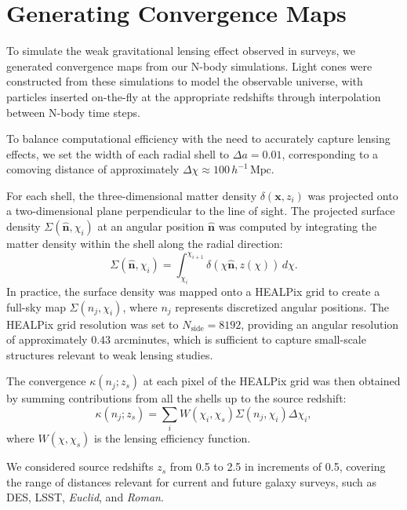 \section{Generating Convergence Maps}
To simulate the weak gravitational lensing effect observed in surveys, we generated convergence maps from our N-body simulations. Light cones were constructed from these simulations to model the observable universe, with particles inserted on-the-fly at the appropriate redshifts through interpolation between N-body time steps.

To balance computational efficiency with the need to accurately capture lensing effects, we set the width of each radial shell to $\Delta a = 0.01$, corresponding to a comoving distance of approximately $\Delta \chi \approx 100 \, h^{-1} \, \text{Mpc}$.

For each shell, the three-dimensional matter density $\delta(\mathbf{x}, z_i)$ was projected onto a two-dimensional plane perpendicular to the line of sight. The projected surface density $\Sigma(\hat{\mathbf{n}}, \chi_i)$ at an angular position $\hat{\mathbf{n}}$ was computed by integrating the matter density within the shell along the radial direction:
\begin{equation}
    \Sigma(\hat{\mathbf{n}}, \chi_i) = \int_{\chi_i}^{\chi_{i+1}} \delta(\chi \hat{\mathbf{n}}, z(\chi)) \, d\chi.
\end{equation}
In practice, the surface density was mapped onto a HEALPix grid \citep{Górski_2005} to create a full-sky map $\Sigma(n_j, \chi_i)$, where $n_j$ represents discretized angular positions. The HEALPix grid resolution was set to $N_{\text{side}} = 8192$, providing an angular resolution of approximately $0.43$ arcminutes, which is sufficient to capture small-scale structures relevant to weak lensing studies.

The convergence $\kappa(n_j; z_s)$ at each pixel of the HEALPix grid was then obtained by summing contributions from all the shells up to the source redshift:
\begin{equation}
    \kappa(n_j; z_s) = \sum_{i} W(\chi_i, \chi_s) \Sigma(n_j, \chi_i) \Delta \chi_i,
\end{equation}
where $W(\chi, \chi_s)$ is the lensing efficiency function.

We considered source redshifts $z_s$ from 0.5 to 2.5 in increments of 0.5, covering the range of distances relevant for current and future galaxy surveys, such as DES, LSST, \textit{Euclid}, and \textit{Roman}.

